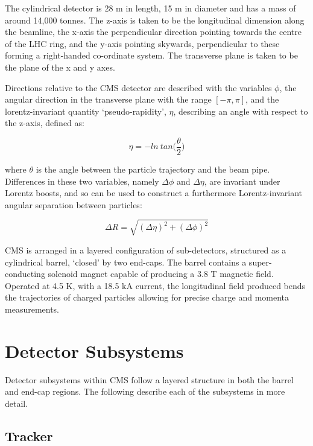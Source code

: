 The cylindrical detector is 28 m in length, 15 m in diameter and has a mass of 
around 14,000 tonnes. 
The z-axis is taken to be the longitudinal dimension along the beamline, the
x-axis the perpendicular direction pointing towards the centre of the LHC ring, 
and the y-axis pointing skywards, perpendicular to these forming a right-handed 
co-ordinate system. The transverse plane is taken to be the plane of the x and y
axes.

Directions relative to the CMS detector are described with the variables $\phi$,
the angular direction in the transverse plane with the range $[-\pi, \pi]$, and 
the lorentz-invariant quantity `pseudo-rapidity', $\eta$, describing an angle
with respect to the z-axis, defined as:

\begin{equation}
\eta = - ln \ tan \Bigg( \frac{\theta}{2} \Bigg)
\end{equation}

where $\theta$ is the angle between the particle trajectory and the beam pipe.
Differences in these two variables, namely $\Delta \phi$ and $\Delta 
\eta$, are invariant under Lorentz boosts, and so can be used to construct a 
furthermore Lorentz-invariant angular separation between particles:

\begin{equation}
\Delta R = \sqrt{ (\Delta \eta)^2 + (\Delta \phi)^2}
\end{equation}

CMS is arranged in a layered configuration of sub-detectors, structured as a 
cylindrical barrel, `closed' by two end-caps. The barrel contains a
super-conducting solenoid magnet capable of producing a 3.8 T magnetic field. 
Operated at 4.5 K, with a 18.5 kA current, the longitudinal field produced bends
the trajectories of charged particles allowing for precise charge and momenta 
measurements.

\section{Detector Subsystems}  %
\label{sec:detector_subsystems}

Detector subsystems within CMS follow a layered structure in both the barrel and
end-cap regions. The following describe each of the subsystems in more detail.

\subsection{Tracker}

